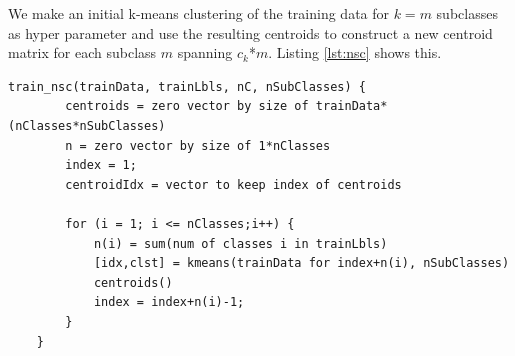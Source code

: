 \documentclass[journal]{IEEEtran}
\begin{document}
We make an initial k-means clustering of the training data for $k=m$ subclasses as hyper parameter and use the resulting centroids to construct a new centroid matrix for each subclass $m$ spanning $c_{k}$*$m$. Listing \ref{lst:nsc} shows this.

\begin{minipage}[H]{0.95\linewidth}
	\begin{lstlisting}[caption=Implementation of NSC., label={lst:nsc}]
	train_nsc(trainData, trainLbls, nC, nSubClasses) {
		centroids = zero vector by size of trainData*(nClasses*nSubClasses)
		n = zero vector by size of 1*nClasses
		index = 1;
		centroidIdx = vector to keep index of centroids
	
		for (i = 1; i <= nClasses;i++) {
			n(i) = sum(num of classes i in trainLbls)
			[idx,clst] = kmeans(trainData for index+n(i), nSubClasses)
			centroids()
			index = index+n(i)-1;
		}
	}
	\end{lstlisting}
\end{minipage}





















 
\end{document}
